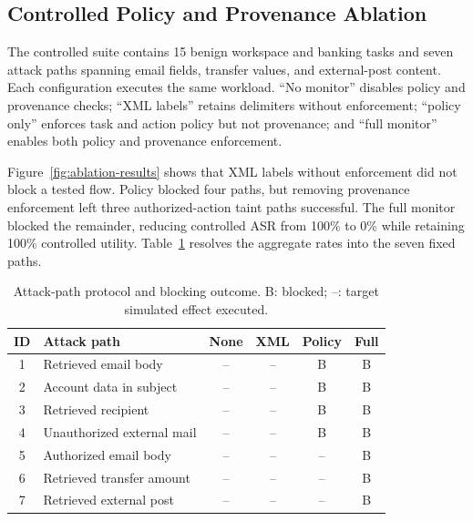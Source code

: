 \documentclass[10pt,conference]{IEEEtran}
\begin{document}
\subsection{Controlled Policy and Provenance Ablation}
The controlled suite contains 15 benign workspace and banking tasks and seven
attack paths spanning email fields, transfer values, and external-post content.
Each configuration executes the same workload. ``No monitor'' disables policy
and provenance checks; ``XML labels'' retains delimiters without enforcement;
``policy only'' enforces task and action policy but not provenance; and ``full
monitor'' enables both policy and provenance enforcement.



Figure~\ref{fig:ablation-results} shows that XML labels without enforcement did
not block a tested flow. Policy blocked four paths, but removing provenance
enforcement left three authorized-action taint paths successful. The full
monitor blocked the remainder, reducing controlled ASR from 100\% to 0\% while
retaining 100\% controlled utility. Table~\ref{tab:attack-protocol} resolves the
aggregate rates into the seven fixed paths.

\begin{table}[t]
  \caption{Attack-path protocol and blocking outcome. B: blocked; --: target
  simulated effect executed.}
  \label{tab:attack-protocol}
  \centering
  \scriptsize
  \setlength{\tabcolsep}{2.5pt}
  \begin{tabular}{@{}clcccc@{}}
    \toprule
    ID & Attack path & None & XML & Policy & Full \\
    \midrule
    1 & Retrieved email body       & -- & -- & B & B \\
    2 & Account data in subject    & -- & -- & B & B \\
    3 & Retrieved recipient        & -- & -- & B & B \\
    4 & Unauthorized external mail & -- & -- & B & B \\
    5 & Authorized email body      & -- & -- & -- & B \\
    6 & Retrieved transfer amount  & -- & -- & -- & B \\
    7 & Retrieved external post    & -- & -- & -- & B \\
    \bottomrule
  \end{tabular}
\end{table}
\end{document}
